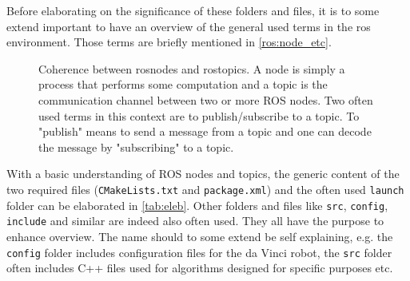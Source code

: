\begin{comment}
:Title: Simple graph
:Tags: Arrows;Diagrams;Graphs;Mathematics
:Author: Stefan Kottwitz
:Slug: graph

A simple example of a graph with straight and bend arrows and loops.
It has been posted as answer to the question
http://tex.stackexchange.com/q/45734/213 of Ichibann.

* Define styles for edges, arrows, and nodes
* Place the main nodes
* Draw edges with nodes for description
* Use options `loop` and `bend` for loops and bent edges
* Specify `left` and `right` for bend direction and node placement
\end{comment}

Before elaborating on the significance of these folders and files, it is to some extend important to have an overview of the general used terms in the \gls{ros} environment. Those terms are briefly mentioned in \autoref{ros:node_etc}. 
\begin{figure}[H]
\center
{}
\caption{Coherence between rosnodes and rostopics. A node is simply a process that performs some computation and a topic is the communication channel between two or more ROS nodes. Two often used terms in this context are to publish/subscribe to a topic. To "publish" means to send a message from a topic and one can decode the message by "subscribing" to a topic.}
\label{ros:node_etc}
\end{figure}
With a basic understanding of ROS nodes and topics, the generic content of the two required files (\texttt{CMakeLists.txt} and \texttt{package.xml}) and the often used \texttt{launch} folder can be elaborated in \autoref{tab:eleb}. Other folders and files like \texttt{src}, \texttt{config}, \texttt{include} and similar are indeed also often used. They all have the purpose to enhance overview. The name should to some extend be self explaining, e.g. the \texttt{config} folder includes configuration files for the da Vinci robot, the \texttt{src} folder often includes C++ files used for algorithms designed for specific purposes etc.
